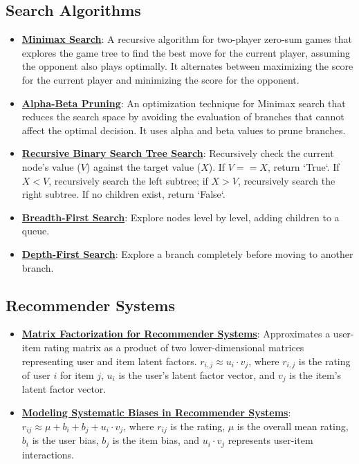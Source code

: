 \documentclass{article}%
\begin{document}
\subsection{Search Algorithms}%
\label{subsec:SearchAlgorithms}%
\begin{itemize}[leftmargin=*]%
\item \href{https://www.math.purdue.edu/~yipn/351/02L2-Intro.pdf#page=22}{\textbf{Minimax Search}}: A recursive algorithm for two-player zero-sum games that explores the game tree to find the best move for the current player, assuming the opponent also plays optimally. It alternates between maximizing the score for the current player and minimizing the score for the opponent.%
\item \href{https://www.math.purdue.edu/~yipn/351/02L2-Intro.pdf#page=23}{\textbf{Alpha-Beta Pruning}}: An optimization technique for Minimax search that reduces the search space by avoiding the evaluation of branches that cannot affect the optimal decision. It uses alpha and beta values to prune branches.%
\item \href{https://www.math.purdue.edu/~yipn/351/14L1-DepthFS.pdf#page=10}{\textbf{Recursive Binary Search Tree Search}}: Recursively check the current node's value ($V$) against the target value ($X$). If $V == X$, return `True`. If $X < V$, recursively search the left subtree; if $X > V$, recursively search the right subtree. If no children exist, return `False`.%
\item \href{https://www.math.purdue.edu/~yipn/351/14L1-DepthFS.pdf#page=8}{\textbf{Breadth-First Search}}: Explore nodes level by level, adding children to a queue.%
\item \href{https://www.math.purdue.edu/~yipn/351/14L1-DepthFS.pdf#page=8}{\textbf{Depth-First Search}}: Explore a branch completely before moving to another branch.%
\end{itemize}

%
\subsection{Recommender Systems}%
\label{subsec:RecommenderSystems}%
\begin{itemize}[leftmargin=*]%
\item \href{https://www.math.purdue.edu/~yipn/351/11L2-svd-pca-recommender.pdf#page=36}{\textbf{Matrix Factorization for Recommender Systems}}: Approximates a user-item rating matrix as a product of two lower-dimensional matrices representing user and item latent factors. $r_{i,j} \approx u_i \cdot v_j$, where $r_{i,j}$ is the rating of user $i$ for item $j$, $u_i$ is the user's latent factor vector, and $v_j$ is the item's latent factor vector.%
\item \href{https://www.math.purdue.edu/~yipn/351/11L2-svd-pca-recommender.pdf#page=44}{\textbf{Modeling Systematic Biases in Recommender Systems}}: $r_{ij} \approx \mu + b_i + b_j + u_i \cdot v_j$, where $r_{ij}$ is the rating, $\mu$ is the overall mean rating, $b_i$ is the user bias, $b_j$ is the item bias, and $u_i \cdot v_j$ represents user-item interactions.%
\end{itemize}
\end{document}
